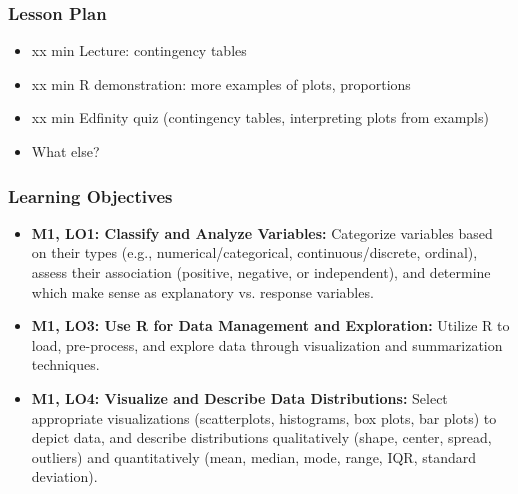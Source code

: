 \begin{frame}
    \frametitle{Lesson Plan}
    \begin{itemize}
        \item xx min Lecture: contingency tables
        \item xx min R demonstration: more examples of plots, proportions
        \item xx min Edfinity quiz (contingency tables, interpreting plots from exampls)
        \item What else? %
    \end{itemize}
\end{frame}

\begin{frame}
    \frametitle{Learning Objectives}
    \begin{itemize}
        \item \textbf{M1, LO1: Classify and Analyze Variables:} Categorize variables based on their types (e.g., numerical/categorical, continuous/discrete, ordinal), assess their association (positive, negative, or independent), and determine which make sense as explanatory vs. response variables.
        \item \textbf{M1, LO3: Use R for Data Management and Exploration:} Utilize R to load, pre-process, and explore data through visualization and summarization techniques.
        \item \textbf{M1, LO4: Visualize and Describe Data Distributions:} Select appropriate visualizations (scatterplots, histograms, box plots, bar plots) to depict data, and describe distributions qualitatively (shape, center, spread, outliers) and quantitatively (mean, median, mode, range, IQR, standard deviation).
    \end{itemize}
\end{frame}


